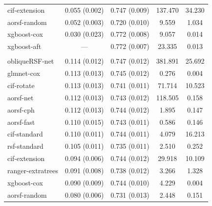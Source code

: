 \documentclass{article}\usepackage[]{graphicx}\usepackage[]{xcolor}
\newenvironment{knitrout}{}{} %
\begin{document}
\begin{knitrout}
\begin{longtable}[t]{lcccc}
\hspace{1em}cif-extension & 0.055 (0.002) & 0.747 (0.009) & 137.470 & 34.230\\
\hspace{1em}aorsf-random & 0.052 (0.003) & 0.720 (0.010) & 9.559 & 1.034\\
\hspace{1em}xgboost-cox & 0.030 (0.023) & 0.772 (0.008) & 9.057 & 0.014\\
\hspace{1em}xgboost-aft & --- & 0.772 (0.007) & 23.335 & 0.013\\
\addlinespace[0.3em]
\multicolumn{5}{l}{\textit{\textbf{Systolic Heart Failure; death, n = 2231, p = 41}}}\\
\hline
\hspace{1em}obliqueRSF-net & 0.114 (0.012) & 0.747 (0.012) & 381.891 & 25.692\\
\hspace{1em}glmnet-cox & 0.113 (0.013) & 0.745 (0.012) & 0.276 & 0.004\\
\hspace{1em}cif-rotate & 0.113 (0.013) & 0.741 (0.011) & 71.714 & 10.523\\
\hspace{1em}aorsf-net & 0.112 (0.013) & 0.743 (0.012) & 118.505 & 0.158\\
\hspace{1em}aorsf-cph & 0.112 (0.013) & 0.744 (0.012) & 1.895 & 0.147\\
\hspace{1em}aorsf-fast & 0.110 (0.015) & 0.743 (0.011) & 0.586 & 0.146\\
\hspace{1em}cif-standard & 0.110 (0.011) & 0.744 (0.011) & 4.079 & 16.213\\
\hspace{1em}rsf-standard & 0.105 (0.011) & 0.735 (0.011) & 2.510 & 0.252\\
\hspace{1em}cif-extension & 0.094 (0.006) & 0.744 (0.012) & 29.918 & 10.109\\
\hspace{1em}ranger-extratrees & 0.091 (0.008) & 0.738 (0.012) & 3.266 & 1.328\\
\hspace{1em}xgboost-cox & 0.090 (0.009) & 0.744 (0.010) & 4.229 & 0.004\\
\hspace{1em}aorsf-random & 0.080 (0.006) & 0.731 (0.013) & 2.448 & 0.151\\

\end{longtable}
\end{knitrout}
\end{document}
